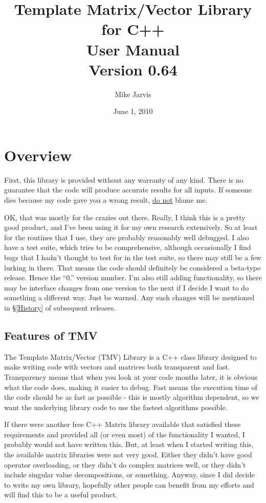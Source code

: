 \documentclass[twoside,letterpaper,11pt]{article}
\newcommand{\tmvversion}{0.64}
\begin{document}
\title{Template Matrix/Vector Library for C++ \\ User Manual \\ Version \tmvversion}
\author{Mike Jarvis}
\date{June 1, 2010}
\maketitle

\tableofcontents

\newpage
\section{Overview}

First, this library is provided without any warranty of any kind.  There is no guarantee
that the code will produce accurate results for all inputs.  If someone dies because
my code gave you a wrong result, \underline{do not} blame me.

OK, that was mostly for the crazies out there.  Really, I think this is a pretty good 
product, and I've been using it for my own research extensively.  So at least 
for the routines that I use, they are probably reasonably well debugged.
I also have a test suite, which tries to be comprehensive, although
occasionally I find bugs that I hadn't thought to test for in the test suite, so 
there may still be a few lurking in there.  That means the code should definitely be considered
a beta-type release.  Hence the ``0.'' version number.  I'm also still adding functionality,
so there may be interface changes from one version to the next if I decide I 
want to do something a different way.  Just be warned.  Any such changes will be 
mentioned in \S\ref{History} of subsequent releases.

\subsection{Features of TMV}

The Template Matrix/Vector (TMV) Library is a C++ class library designed to make
writing code with vectors and matrices both transparent and fast.  Transparency 
means that when you look at your code months later, it is obvious what the code
does, making it easier to debug.  Fast means the execution time of the code should
be as fast as possible - this is mostly algorithm dependent, so we want the 
underlying library code to use the fastest algorithms possible.

If there were another free C++ Matrix library available that satisfied these requirements
and provided all (or even most) of the functionality I wanted, I probably would
not have written this.  But, at least when I started writing this, the available matrix libraries
were not very good.  Either they didn't have good operator overloading, or they 
didn't do complex matrices well, or they didn't include singular value decompositions,
or something.  Anyway, since I did decide to write 
my own library, hopefully other people can benefit from my efforts and will find 
this to be a useful product.
\end{document}
